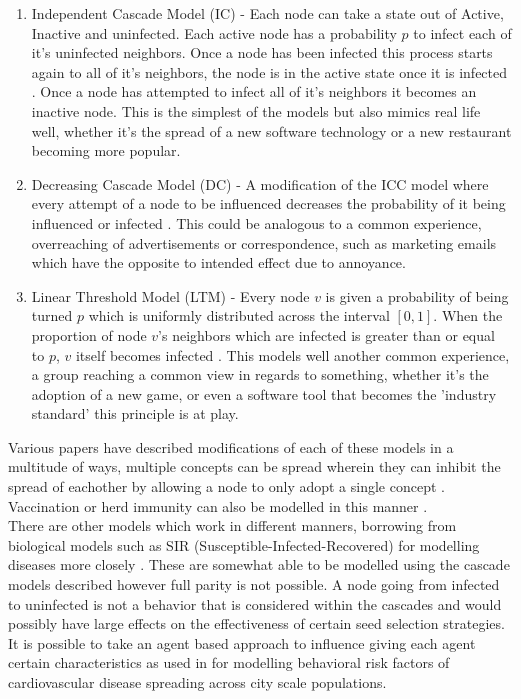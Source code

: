 \documentclass{article}
\begin{document}
\begin{enumerate}
	\item Independent Cascade Model (IC) \cite{tardoskempe2003} - Each node can take a state out of Active, Inactive and uninfected.
	      Each active node has a probability $p$ to infect each of it's uninfected neighbors.
	      Once a node has been infected this process starts again to all of it's neighbors, the node is in the active state once it is infected \cite{tardoskempe2003}.
	      Once a node has attempted to infect all of it's neighbors it becomes an inactive node.
	      This is the simplest of the models but also mimics real life well, whether it's the spread of a new software technology or a new restaurant becoming more popular.
	\item Decreasing Cascade Model (DC) - A modification of the ICC model where every attempt of a node to be influenced decreases the probability of it being influenced or infected \cite{kempe2005influential}.
	      This could be analogous to a common experience, overreaching of advertisements or correspondence, such as marketing emails which have the opposite to intended effect due to annoyance.
	\item Linear Threshold Model (LTM) - Every node $v$ is given a probability of being turned $p$ which is uniformly distributed across the interval $[0, 1]$. When the proportion of node $v$'s neighbors which are infected is greater than or equal to $p$, $v$ itself becomes infected \cite{tardoskempe2003}.
	      This models well another common experience, a group reaching a common view in regards to something, whether it's the adoption of a new game, or even a software tool that becomes the 'industry standard' this principle is at play.
\end{enumerate}

Various papers have described modifications of each of these models in a multitude of ways, multiple concepts can be spread wherein they can inhibit the spread of eachother by allowing a node to only adopt a single concept \cite{griffiths17LimitiingConcept,goyal2012competitivecontagionnetworks}.
Vaccination or herd immunity can also be modelled in this manner \cite{griffiths17LimitiingConcept}.
\\

There are other models which work in different manners, borrowing from biological models such as SIR (Susceptible-Infected-Recovered) for modelling diseases more closely \cite{kuperman2013invited}. These are somewhat able to be modelled using the cascade models described however full parity is not possible.
A node going from infected to uninfected is not a behavior that is considered within the cascades and would possibly have large effects on the effectiveness of certain seed selection strategies.
It is possible to take an agent based approach to influence giving each agent certain characteristics as used in \cite{archbold2024cvd} for modelling behavioral risk factors of cardiovascular disease spreading across city scale populations.
\\
\end{document}
